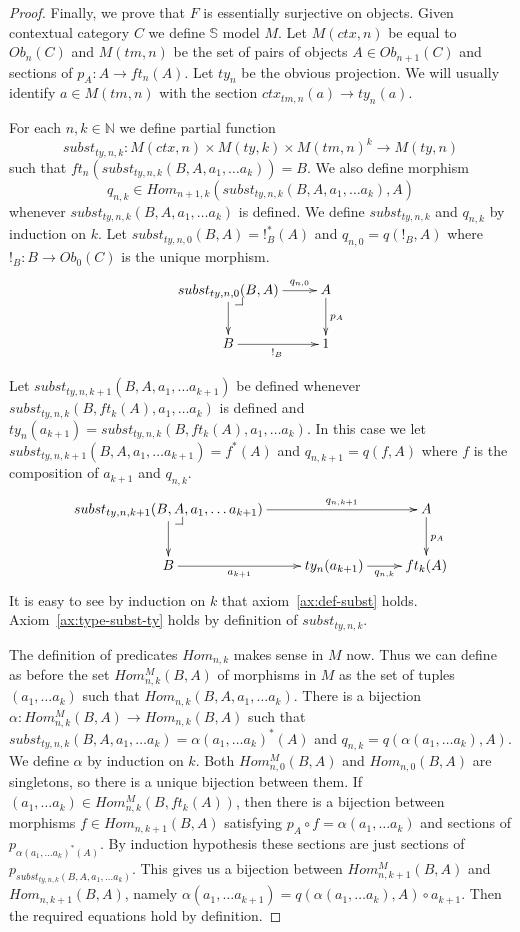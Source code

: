 \documentclass[reqno]{amsart}
\makeatletter
\theoremstyle{definition}
\theoremstyle{remark}
\newcommand{\substTh}{\mathbb{S}}
\numberwithin{figure}{section}
\newcommand{\pb}[1][dr]{\save*!/#1-1.2pc/#1:(-1,1)@^{|-}\restore}
\makeatother
\begin{document}
\begin{proof}
Finally, we prove that $F$ is essentially surjective on objects.
Given contextual category $C$ we define $\substTh$ model $M$.
Let $M(ctx,n)$ be equal to $Ob_n(C)$ and $M(tm,n)$ be the set of pairs of objects $A \in Ob_{n+1}(C)$ and sections of $p_A : A \to ft_n(A)$.
Let $ty_n$ be the obvious projection.
We will usually identify $a \in M(tm,n)$ with the section $ctx_{tm,n}(a) \to ty_n(a)$.

For each $n,k \in \mathbb{N}$ we define partial function
\[ subst_{ty,n,k} : M(ctx,n) \times M(ty,k) \times M(tm,n)^k \to M(ty,n) \]
such that $ft_n(subst_{ty,n,k}(B, A, a_1, \ldots a_k)) = B$.
We also define morphism
\[ q_{n,k} \in Hom_{n+1,k}(subst_{ty,n,k}(B, A, a_1, \ldots a_k), A) \]
whenever $subst_{ty,n,k}(B, A, a_1, \ldots a_k)$ is defined.
We define $subst_{ty,n,k}$ and $q_{n,k}$ by induction on $k$.
Let $subst_{ty,n,0}(B,A) = !_B^*(A)$ and $q_{n,0} = q(!_B,A)$ where $!_B : B \to Ob_0(C)$ is the unique morphism.
\[ \xymatrix{ subst_{ty,n,0}(B,A) \ar[r]^-{q_{n,0}} \ar[d] \pb & A \ar[d]^{p_A} \\
              B \ar[r]_{!_B} & 1
            } \]

Let $subst_{ty,n,k+1}(B, A, a_1, \ldots a_{k+1})$ be defined whenever $subst_{ty,n,k}(B, ft_k(A), \allowbreak a_1, \ldots a_k)$ is defined
    and $ty_n(a_{k+1}) = subst_{ty,n,k}(B, ft_k(A), a_1, \ldots a_k)$.
In this case we let $subst_{ty,n,k+1}(B, A, a_1, \ldots a_{k+1}) = f^*(A)$ and $q_{n,k+1} = q(f,A)$ where $f$ is the composition of $a_{k+1}$ and $q_{n,k}$.
\[ \xymatrix{ subst_{ty,n,k+1}(B, A, a_1, \ldots a_{k+1}) \ar[rr]^-{q_{n,k+1}} \ar[d] \pb & & A \ar[d]^{p_A} \\
              B \ar[r]_-{a_{k+1}} & ty_n(a_{k+1}) \ar[r]_-{q_{n,k}} & ft_k(A)
            } \]
It is easy to see by induction on $k$ that axiom~\eqref{ax:def-subst} holds.
Axiom~\eqref{ax:type-subst-ty} holds by definition of $subst_{ty,n,k}$.

The definition of predicates $Hom_{n,k}$ makes sense in $M$ now.
Thus we can define as before the set $Hom^M_{n,k}(B,A)$ of morphisms in $M$ as the set of tuples $(a_1, \ldots a_k)$ such that $Hom_{n,k}(B, A, a_1, \ldots a_k)$.
There is a bijection $\alpha : Hom^M_{n,k}(B,A) \to Hom_{n,k}(B,A)$ such that
    $subst_{ty,n,k}(B, A, a_1, \ldots a_k) = \alpha(a_1, \ldots a_k)^*(A)$ and $q_{n,k} = q(\alpha(a_1, \ldots a_k), A)$.
We define $\alpha$ by induction on $k$.
Both $Hom^M_{n,0}(B,A)$ and $Hom_{n,0}(B,A)$ are singletons, so there is a unique bijection between them.
If $(a_1, \ldots a_k) \in Hom^M_{n,k}(B,ft_k(A))$, then there is a bijection between morphisms $f \in Hom_{n,k+1}(B,A)$
    satisfying $p_A \circ f = \alpha(a_1, \ldots a_k)$ and sections of $p_{\alpha(a_1, \ldots a_k)^*(A)}$.
By induction hypothesis these sections are just sections of $p_{subst_{ty,n,k}(B, A, a_1, \ldots a_k)}$.
This gives us a bijection between $Hom^M_{n,k+1}(B,A)$ and $Hom_{n,k+1}(B,A)$, namely $\alpha(a_1, \ldots a_{k+1}) = q(\alpha(a_1, \ldots a_k), A) \circ a_{k+1}$.
Then the required equations hold by definition.


\end{proof}
\end{document}
